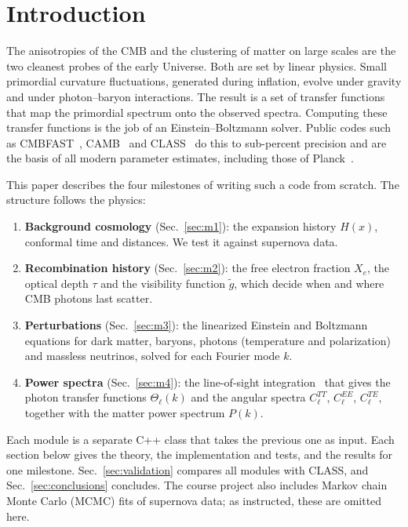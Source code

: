 \documentclass[aps,prd,twocolumn,nofootinbib,superscriptaddress,floatfix]{revtex4-2}
\newcommand{\gt}{\tilde g}
\begin{document}
\maketitle

\section{Introduction}

The anisotropies of the CMB and the clustering of matter on large scales are the two cleanest probes of the
early Universe. Both are set by linear physics. Small primordial curvature fluctuations, generated during inflation,
evolve under gravity and under photon--baryon interactions. The result is a set of transfer functions that map the
primordial spectrum onto the observed spectra. Computing these transfer functions is the job of an
Einstein--Boltzmann solver. Public codes such as CMBFAST~\cite{Seljak1996}, CAMB~\cite{Lewis2000} and
CLASS~\cite{Lesgourgues2011,Blas2011} do this to sub-percent precision and are the basis of all modern parameter
estimates, including those of Planck~\cite{Planck2018params}.

This paper describes the four milestones of writing such a code from scratch. The structure follows the physics:
\begin{enumerate}
\item \textbf{Background cosmology} (Sec.~\ref{sec:m1}): the expansion history $H(x)$, conformal time and distances.
      We test it against supernova data.
\item \textbf{Recombination history} (Sec.~\ref{sec:m2}): the free electron fraction $X_e$, the optical depth $\tau$
      and the visibility function $\gt$, which decide when and where CMB photons last scatter.
\item \textbf{Perturbations} (Sec.~\ref{sec:m3}): the linearized Einstein and Boltzmann equations for dark matter,
      baryons, photons (temperature and polarization) and massless neutrinos, solved for each Fourier mode $k$.
\item \textbf{Power spectra} (Sec.~\ref{sec:m4}): the line-of-sight integration~\cite{Seljak1996} that gives the
      photon transfer functions $\Theta_\ell(k)$ and the angular spectra $C_\ell^{TT}$, $C_\ell^{EE}$, $C_\ell^{TE}$,
      together with the matter power spectrum $P(k)$.
\end{enumerate}
Each module is a separate C++ class that takes the previous one as input. Each section below gives the theory, the
implementation and tests, and the results for one milestone. Sec.~\ref{sec:validation} compares all modules with CLASS,
and Sec.~\ref{sec:conclusions} concludes. The course project also includes Markov chain Monte Carlo (MCMC) fits of
supernova data; as instructed, these are omitted here.
\end{document}
